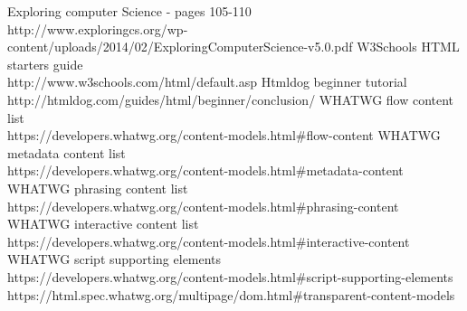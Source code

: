 \documentclass[conference]{IEEEtran}
\begin{document}
\begin{thebibliography}{1}
  Exploring computer Science - pages 105-110\\
  http://www.exploringcs.org/wp-content/uploads/2014/02/ExploringComputerScience-v5.0.pdf
  W3Schools HTML starters guide\\
  http://www.w3schools.com/html/default.asp
  Htmldog beginner tutorial http://htmldog.com/guides/html/beginner/conclusion/
  WHATWG flow content list\\
  https://developers.whatwg.org/content-models.html\#flow-content
  WHATWG metadata content list\\
  https://developers.whatwg.org/content-models.html\#metadata-content
  WHATWG phrasing content list\\
  https://developers.whatwg.org/content-models.html\#phrasing-content
  WHATWG interactive content list\\
  https://developers.whatwg.org/content-models.html\#interactive-content
  WHATWG script supporting elements\\
  https://developers.whatwg.org/content-models.html\#script-supporting-elements
  https://html.spec.whatwg.org/multipage/dom.html\#transparent-content-models

\end{thebibliography}

\end{document}
